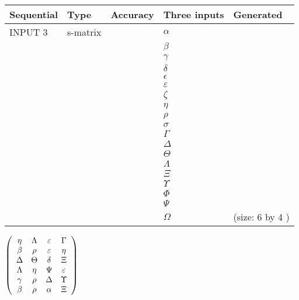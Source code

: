 \documentclass[12pt]{article}
\begin{document}
  
\noindent\begin{tabular}{|l|l|l|l|l|}
\hline
 Sequential & Type & Accuracy & Three inputs & Generated \\ 
\hline
 
 
  INPUT $  3 $ & s-matrix & & 
 $  \alpha $ & 
  \\
  & & & 
 $  \beta $ & 
  \\
  & & & 
 $  \gamma $ & 
  \\
  & & & 
 $  \delta $ & 
  \\
  & & & 
 $  \epsilon $ & 
  \\
  & & & 
 $  \varepsilon $ & 
  \\
  & & & 
 $                     \zeta $ & 
  \\
  & & & 
 $  \eta $ & 
  \\
  & & & 
 $  \rho $ & 
  \\
  & & & 
 $  \sigma $ & 
  \\
  & & & 
 $  \Gamma $ & 
  \\
  & & & 
 $  \Delta $ & 
  \\
  & & & 
 $  \Theta $ & 
  \\
  & & & 
 $  \Lambda $ & 
  \\
  & & & 
 $                     \Xi $ & 
  \\
  & & & 
 $  \Upsilon $ & 
  \\
  & & & 
 $  \Phi $ & 
  \\
  & & & 
 $  \Psi $ & 
  \\
  & & & 
 $  \Omega $ & 
  (size:  6  by  4 )
 \\  \hline  
 \end{tabular}
   
   
 $  \left( \begin{array}
 {
 c
 c
 c
 c
 }
 \eta & 
 \Lambda & 
 \varepsilon & 
 \Gamma \\ 
 \beta & 
 \rho & 
 \varepsilon & 
 \eta \\ 
 \Delta & 
 \Theta & 
 \delta & 
                    \Xi \\ 
 \Lambda & 
 \eta & 
 \Psi & 
 \varepsilon \\ 
 \gamma & 
 \rho & 
 \Delta & 
 \Upsilon \\ 
 \beta & 
 \rho & 
 \alpha & 
                    \Xi
 \end{array} \right) $ 
  
\end{document}
